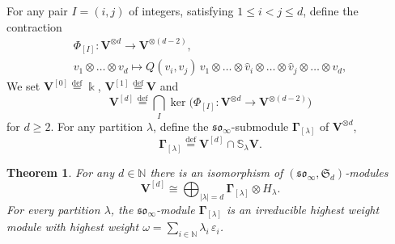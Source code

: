 \documentclass[12pt,reqno]{amsart}
\numberwithin{equation}{section}
\theoremstyle{plain}
\newtheorem{thm}{Theorem}[section]
\theoremstyle{definition}
\def\N{\mathbb N}
\def\eps{\varepsilon}
\def\bydef{\overset{\mathrm {def}}=}
\def\so{\mathfrak{so}}
\def\o{\otimes}
\def\soV_#1{\boldsymbol\Gamma_{[#1]}}
\def\VV{\mathbf V}
\begin{document}
For any pair $I = (i,j)$ of integers, satisfying $1 \le i < j \le
d$, define the contraction
\begin{equation}
\begin{gathered}
    \Phi_{[I]}: \VV^{\o d} \to \VV^{\o (d-2)},\\
    v_1 \o \dots \o v_d \mapsto Q(v_i,v_j) \, v_1 \o \dots \o \hat
    v_i \o \dots \o \hat v_j \o \dots \o v_d,
\end{gathered}
\end{equation}
We set $\VV^{[0]}  \bydef \Bbbk$, $\VV^{[1]} \bydef \VV$ and
\begin{equation}
    \VV^{[d]} \bydef \bigcap_{I} \ker
    \biggr( \Phi_{[I]}: \VV^{\o d} \to
    \VV^{\o(d-2)}\biggr)
\end{equation}
for $d\ge2$. For any partition $\lambda$, define the $\so_\infty$-submodule
$\soV_{\lambda}$ of $\VV^{\o d}$,
\begin{equation*}
    \soV_{\lambda} \bydef  \VV^{[d]} \cap \mathbb S_\lambda \VV.
\end{equation*}



\begin{thm}\label{thm:so Schur-Weyl infinite}
For any $d \in \N$ there is an isomorphism of $(\so_\infty,\mathfrak
S_d)$-modules
\begin{equation}\label{eq:so Schur-Weyl infinite}
    \VV^{[d]} \cong \bigoplus_{|\lambda| = d} \soV_\lambda \o
    H_\lambda.
\end{equation}
For every partition $\lambda$, the $\so_\infty$-module
$\soV_{\lambda}$ is an irreducible highest weight module with
highest weight $\omega = \sum_{i \in \N} \lambda_i \, \eps_i$.
\end{thm}
\end{document}
